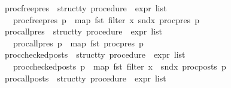 \begin{isabellebody}
\isanewline
{}\isamarkupfalse%
\ proc{\isacharunderscore}{\kern0pt}free{\isacharunderscore}{\kern0pt}pres\ {\isacharcolon}{\kern0pt}{\isacharcolon}{\kern0pt}\ {\isachardoublequoteopen}{\isacharprime}{\kern0pt}struct{\isacharunderscore}{\kern0pt}ty\ procedure\ {\isasymRightarrow}\ expr\ list{\isachardoublequoteclose}\isanewline
\ \ \ {\isachardoublequoteopen}proc{\isacharunderscore}{\kern0pt}free{\isacharunderscore}{\kern0pt}pres\ p\ {\isacharequal}{\kern0pt}\ map\ fst\ {\isacharparenleft}{\kern0pt}filter\ {\isacharparenleft}{\kern0pt}{\isasymlambda}x{\isachardot}{\kern0pt}\ snd{\isacharparenleft}{\kern0pt}x{\isacharparenright}{\kern0pt}{\isacharparenright}{\kern0pt}\ {\isacharparenleft}{\kern0pt}proc{\isacharunderscore}{\kern0pt}pres\ p{\isacharparenright}{\kern0pt}{\isacharparenright}{\kern0pt}{\isachardoublequoteclose}\isanewline
\isanewline
{}\isamarkupfalse%
\ proc{\isacharunderscore}{\kern0pt}all{\isacharunderscore}{\kern0pt}pres\ {\isacharcolon}{\kern0pt}{\isacharcolon}{\kern0pt}\ {\isachardoublequoteopen}{\isacharprime}{\kern0pt}struct{\isacharunderscore}{\kern0pt}ty\ procedure\ {\isasymRightarrow}\ expr\ list{\isachardoublequoteclose}\isanewline
\ \ \ {\isachardoublequoteopen}proc{\isacharunderscore}{\kern0pt}all{\isacharunderscore}{\kern0pt}pres\ p\ {\isacharequal}{\kern0pt}\ map\ fst\ {\isacharparenleft}{\kern0pt}proc{\isacharunderscore}{\kern0pt}pres\ p{\isacharparenright}{\kern0pt}{\isachardoublequoteclose}\isanewline
\isanewline
{}\isamarkupfalse%
\ proc{\isacharunderscore}{\kern0pt}checked{\isacharunderscore}{\kern0pt}posts\ {\isacharcolon}{\kern0pt}{\isacharcolon}{\kern0pt}\ {\isachardoublequoteopen}{\isacharprime}{\kern0pt}struct{\isacharunderscore}{\kern0pt}ty\ procedure\ {\isasymRightarrow}\ expr\ list{\isachardoublequoteclose}\isanewline
\ \ \ {\isachardoublequoteopen}proc{\isacharunderscore}{\kern0pt}checked{\isacharunderscore}{\kern0pt}posts\ p\ {\isacharequal}{\kern0pt}\ map\ fst\ {\isacharparenleft}{\kern0pt}filter\ {\isacharparenleft}{\kern0pt}{\isasymlambda}x{\isachardot}{\kern0pt}\ {\isasymnot}\ snd{\isacharparenleft}{\kern0pt}x{\isacharparenright}{\kern0pt}{\isacharparenright}{\kern0pt}\ {\isacharparenleft}{\kern0pt}proc{\isacharunderscore}{\kern0pt}posts\ p{\isacharparenright}{\kern0pt}{\isacharparenright}{\kern0pt}{\isachardoublequoteclose}\isanewline
\isanewline
{}\isamarkupfalse%
\ proc{\isacharunderscore}{\kern0pt}all{\isacharunderscore}{\kern0pt}posts\ {\isacharcolon}{\kern0pt}{\isacharcolon}{\kern0pt}\ {\isachardoublequoteopen}{\isacharprime}{\kern0pt}struct{\isacharunderscore}{\kern0pt}ty\ procedure\ {\isasymRightarrow}\ expr\ list{\isachardoublequoteclose}\isanewline

\end{isabellebody}
